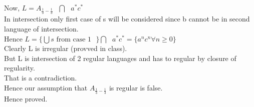\documentclass{article}
\begin{document}
Now, $L = A_{\frac{1}{3}-\frac{1}{3}} \text{ } \bigcap \text{ } a^*c^* $\\
In intersection only first case of s will be considered since b cannot be in second language of intersection.\\
Hence $L = \{ \bigcup {s \text{ from case 1}} \text{ } \} \bigcap \text{ } a^*c^* = \{a^nc^n \forall n \geq 0 \}$ \\
Clearly L is irregular (provved in class).\\
But L is intersection of 2 regular languages and has to regular by closure of regularity.\\
That is a contradiction.\\
Hence our assumption that $A_{\frac{1}{3}-\frac{1}{3}}$ is regular is false.\\
Hence proved.

\pagebreak
\end{document}
